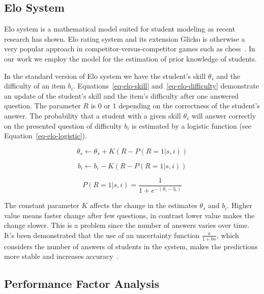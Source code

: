 \subsection{Elo System}
\label{elo}

Elo system is a mathematical model suited for student modeling as recent research has shown. Elo rating system and its extension Glicko is otherwise a very popular approach in competitor-versus-competitor games such as chess~\cite{Vanek2014}. In our work we employ the model for the estimation of prior knowledge of students.

In the standard version of Elo system we have the student's skill $\theta_s$ and the difficulty of an item $b_i$. Equations~\ref{eq-elo-skill} and~\ref{eq-elo-difficulty} demonstrate an update of the student's skill and the item's difficulty after one answered question. The parameter $R$ is $0$ or $1$ depending on the correctness of the student's answer. The probability that a student with a given skill $\theta_s$ will answer correctly on the presented question of difficulty $b_i$ is estimated by a logistic function (see Equation~\ref{eq-elo-logistic}).

\begin{equation} \label{eq-elo-skill}
  \theta_s \gets \theta_s + K(R - P(R = 1|s,i))
\end{equation}

\begin{equation} \label{eq-elo-difficulty}
  b_i \gets b_i - K(R - P(R = 1|s,i))
\end{equation}

\begin{equation} \label{eq-elo-logistic}
  P(R = 1|s,i) = \frac{1}{1 + e^{-(\theta_s - b_i)}}
\end{equation}

The constant parameter $K$ affects the change in the estimates $\theta_s$ and $b_i$. Higher value means faster change after few questions, in contrast lower value makes the change slower. This is a problem since the number of answers varies over time. It's been demonstrated that the use of an uncertainty function $\frac{a}{1 + bn}$, which considers the number of answers of students in the system, makes the predictions more stable and increases accuracy~\cite{Vanek2014}.

\subsection{Performance Factor Analysis}
\label{pfa}

